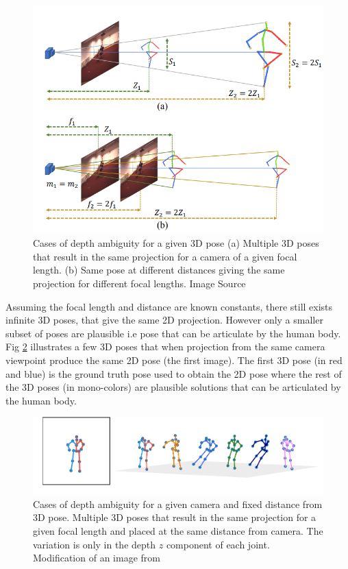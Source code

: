 \begin{figure}[h]
    \centering
    \includegraphics[width=\textwidth]{figures/background/depthambi.png}
    \caption{Cases of depth ambiguity for a given 3D pose (a) Multiple 3D poses that result in the same projection for a camera of a given focal length. (b) Same pose at different distances giving the same projection for different focal lengths.
    Image Source \cite{poselifter}}

    \label{fig:depth_ambiguity_case1}
\end{figure}

Assuming the focal length and distance are known constants, there still exists infinite 3D poses, that give the same 2D projection. However only a smaller subset of poses are plausible i.e pose that can be articulate by the human body. Fig \ref{fig:depth_ambiguity_case2} illustrates a few 3D poses that when projection from the same camera viewpoint produce the same 2D pose (the first image). The first 3D pose (in red and blue) is the ground truth pose used to obtain the 2D pose where the rest of the 3D poses (in mono-colors) are plausible solutions that can be articulated by the human body. 

\begin{figure}[h]
    \centering
    \includegraphics[width=\textwidth]{figures/h36_viz/multiple3d_per_2d.pdf}
    \caption{Cases of depth ambiguity for a given camera and fixed distance from 3D pose. Multiple 3D poses that result in the same projection for a given focal length and placed at the same distance from camera. The variation is only in the depth $z$ component of each joint. Modification of an image from \cite{poselifter}}

    \label{fig:depth_ambiguity_case2}
\end{figure}


